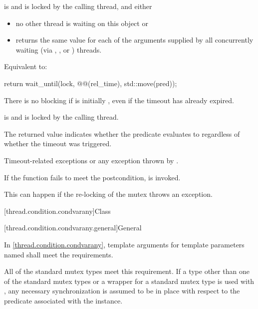 \begin{itemdescr}
\pnum
\expects
{} is  and 
is locked by the calling thread, and either
\begin{itemize}
\item
no other thread is waiting on this  object or

\item
{} returns the same value for each of the  arguments
supplied by all concurrently waiting (via , , or
) threads.
\end{itemize}

\pnum
\effects
Equivalent to:
\begin{codeblock}
return wait_until(lock, @@(rel_time), std::move(pred));
\end{codeblock}

\pnum
\begin{note}
There is no blocking if  is initially , even if the
timeout has already expired.
\end{note}

\pnum
\ensures
{} is  and 
is locked by the calling thread.

\pnum
\begin{note}
The returned value indicates whether the predicate evaluates to 
regardless of whether the timeout was triggered.
\end{note}

\pnum
\throws
Timeout-related
exceptions or any exception thrown by .

\pnum
\remarks
If the function fails to meet the postcondition, 
is invoked.
\begin{note}
This can happen if the re-locking of the mutex throws an exception.
\end{note}
\end{itemdescr}

[thread.condition.condvarany]{Class }

[thread.condition.condvarany.general]{General}

\pnum
In \ref{thread.condition.condvarany},
template arguments for template parameters named 
shall meet the 
requirements.
\begin{note}
All of the standard
mutex types meet this requirement. If a type other than one of the
standard mutex types or a  wrapper for a standard mutex type
is used with , any
necessary synchronization is assumed to be in place with respect to the predicate associated
with the  instance.
\end{note}

